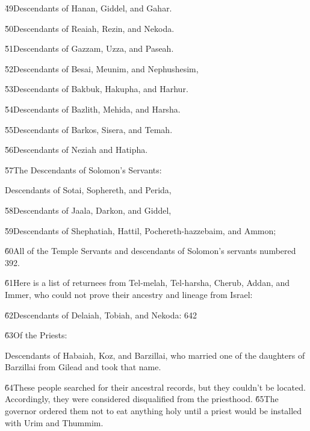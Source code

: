 \v{49}Descendants of Hanan, Giddel, and Gahar.

\v{50}Descendants of Reaiah, Rezin, and Nekoda.

\v{51}Descendants of Gazzam, Uzza, and Paseah.

\v{52}Descendants of Besai, Meunim, and Nephushesim,

\v{53}Descendants of Bakbuk, Hakupha, and Harhur.

\v{54}Descendants of Bazlith, Mehida, and Harsha.

\v{55}Descendants of Barkos, Sisera, and Temah.

\v{56}Descendants of Neziah and Hatipha.

\v{57}The Descendants of Solomon's Servants:

Descendants of Sotai, Sophereth, and Perida,

\v{58}Descendants of Jaala, Darkon, and Giddel,

\v{59}Descendants of Shephatiah, Hattil, Pochereth-hazzebaim, and Ammon;

\v{60}All of the Temple Servants and descendants of Solomon's servants numbered 392.

\v{61}Here is a list of returnees from Tel-melah, Tel-harsha, Cherub, Addan, and Immer, who could not prove their ancestry and lineage from Israel:

\v{62}Descendants of Delaiah, Tobiah, and Nekoda: 642

\v{63}Of the Priests:

Descendants of Habaiah, Koz, and Barzillai, who married one of the daughters of Barzillai from Gilead and took that name.

\v{64}These people searched for their ancestral records, but they couldn't be located. Accordingly, they were considered disqualified from the priesthood. \v{65}The governor ordered them not to eat anything holy until a priest would be installed with Urim and Thummim.

